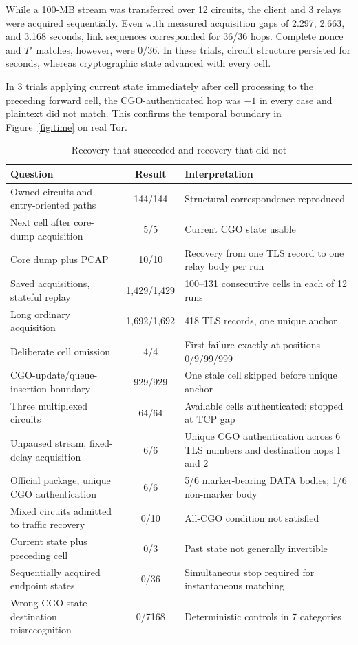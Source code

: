 \documentclass[10pt,a4paper]{article}
\begin{document}
While a 100-MB stream was transferred over 12 circuits, the client and 3 relays were acquired sequentially.
Even with measured acquisition gaps of 2.297, 2.663, and 3.168 seconds, link sequences corresponded for 36/36 hops. Complete nonce and $T'$ matches, however, were 0/36.
In these trials, circuit structure persisted for seconds, whereas cryptographic state advanced with every cell.

In 3 trials applying current state immediately after cell processing to the preceding forward cell, the CGO-authenticated hop was $-1$ in every case and plaintext did not match. This confirms the temporal boundary in Figure~\ref{fig:time} on real Tor.

\begin{table}[!tbp]
\centering
\caption{Recovery that succeeded and recovery that did not}
\label{tab:boundary}
\small
\begin{tabularx}{\linewidth}{YcY}
\toprule
Question & Result & Interpretation \\
\midrule
Owned circuits and entry-oriented paths & 144/144 & Structural correspondence reproduced \\
Next cell after core-dump acquisition & 5/5 & Current CGO state usable \\
Core dump plus PCAP & 10/10 & Recovery from one TLS record to one relay body per run \\
Saved acquisitions, stateful replay & 1,429/1,429 & 100--131 consecutive cells in each of 12 runs \\
Long ordinary acquisition & 1,692/1,692 & 418 TLS records, one unique anchor \\
Deliberate cell omission & 4/4 & First failure exactly at positions 0/9/99/999 \\
CGO-update/queue-insertion boundary & 929/929 & One stale cell skipped before unique anchor \\
Three multiplexed circuits & 64/64 & Available cells authenticated; stopped at TCP gap \\
Unpaused stream, fixed-delay acquisition & 6/6 & Unique CGO authentication across 6 TLS numbers and destination hops 1 and 2 \\
Official package, unique CGO authentication & 6/6 & 5/6 marker-bearing DATA bodies; 1/6 non-marker body \\
Mixed circuits admitted to traffic recovery & 0/10 & All-CGO condition not satisfied \\
Current state plus preceding cell & 0/3 & Past state not generally invertible \\
Sequentially acquired endpoint states & 0/36 & Simultaneous stop required for instantaneous matching \\
Wrong-CGO-state destination misrecognition & 0/7168 & Deterministic controls in 7 categories \\
\bottomrule
\end{tabularx}
\end{table}
\end{document}
